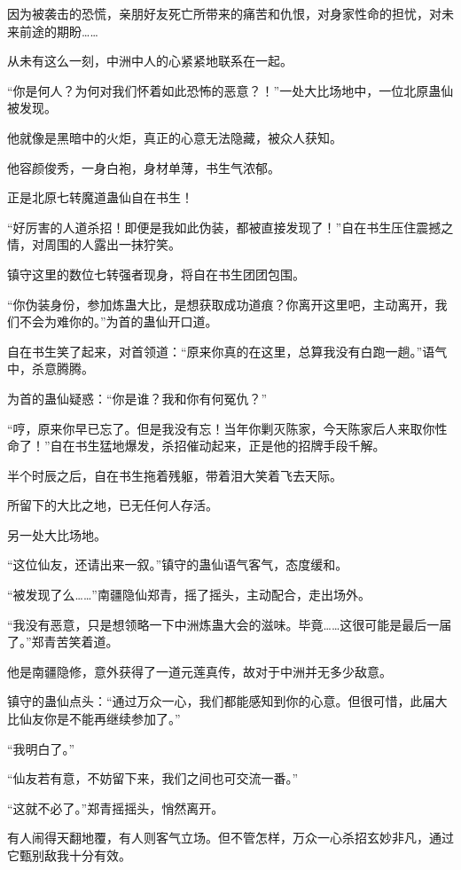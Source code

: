 \begin{this_body}
因为被袭击的恐慌，亲朋好友死亡所带来的痛苦和仇恨，对身家性命的担忧，对未来前途的期盼……

从未有这么一刻，中洲中人的心紧紧地联系在一起。

“你是何人？为何对我们怀着如此恐怖的恶意？！”一处大比场地中，一位北原蛊仙被发现。

他就像是黑暗中的火炬，真正的心意无法隐藏，被众人获知。

他容颜俊秀，一身白袍，身材单薄，书生气浓郁。

正是北原七转魔道蛊仙自在书生！

“好厉害的人道杀招！即便是我如此伪装，都被直接发现了！”自在书生压住震撼之情，对周围的人露出一抹狞笑。

镇守这里的数位七转强者现身，将自在书生团团包围。

“你伪装身份，参加炼蛊大比，是想获取成功道痕？你离开这里吧，主动离开，我们不会为难你的。”为首的蛊仙开口道。

自在书生笑了起来，对首领道：“原来你真的在这里，总算我没有白跑一趟。”语气中，杀意腾腾。

为首的蛊仙疑惑：“你是谁？我和你有何冤仇？”

“哼，原来你早已忘了。但是我没有忘！当年你剿灭陈家，今天陈家后人来取你性命了！”自在书生猛地爆发，杀招催动起来，正是他的招牌手段千解。

半个时辰之后，自在书生拖着残躯，带着泪大笑着飞去天际。

所留下的大比之地，已无任何人存活。

另一处大比场地。

“这位仙友，还请出来一叙。”镇守的蛊仙语气客气，态度缓和。

“被发现了么……”南疆隐仙郑青，摇了摇头，主动配合，走出场外。

“我没有恶意，只是想领略一下中洲炼蛊大会的滋味。毕竟……这很可能是最后一届了。”郑青苦笑着道。

他是南疆隐修，意外获得了一道元莲真传，故对于中洲并无多少敌意。

镇守的蛊仙点头：“通过万众一心，我们都能感知到你的心意。但很可惜，此届大比仙友你是不能再继续参加了。”

“我明白了。”

“仙友若有意，不妨留下来，我们之间也可交流一番。”

“这就不必了。”郑青摇摇头，悄然离开。

有人闹得天翻地覆，有人则客气立场。但不管怎样，万众一心杀招玄妙非凡，通过它甄别敌我十分有效。


\end{this_body}
